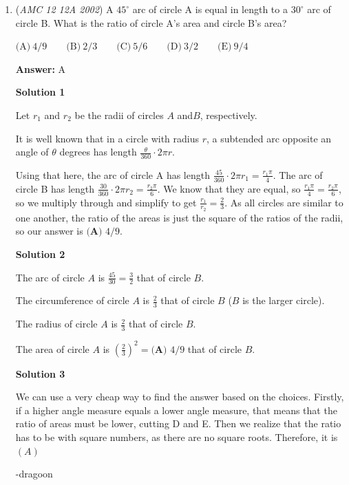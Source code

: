 \begin{enumerate}
 


	\item (\textit{AMC 12 12A 2002}) A $45^\circ$ arc of circle A is equal in length to a $30^\circ$ arc of circle B. What is the ratio of circle A's area and circle B's area?


 $\text{(A)}\ 4/9 \qquad \text{(B)}\ 2/3 \qquad \text{(C)}\ 5/6 \qquad \text{(D)}\ 3/2 \qquad \text{(E)}\ 9/4$

 \textbf{Answer: }A



\textbf{Solution 1}

Let $r_1$ and $r_2$ be the radii of circles $A$ and$B$, respectively. 

 It is well known that in a circle with radius $r$, a subtended arc opposite an angle of $\theta$ degrees has length $\frac{\theta}{360} \cdot 2\pi r$. 

 Using that here, the arc of circle A has length $\frac{45}{360}\cdot2\pi{r_1}=\frac{r_1\pi}{4}$. The arc of circle B has length $\frac{30}{360} \cdot 2\pi{r_2}=\frac{r_2\pi}{6}$. We know that they are equal, so $\frac{r_1\pi}{4}=\frac{r_2\pi}{6}$, so we multiply through and simplify to get $\frac{r_1}{r_2}=\frac{2}{3}$. As all circles are similar to one another, the ratio of the areas is just the square of the ratios of the radii, so our answer is $\boxed{\textbf{(A) } 4/9}$.

 



\textbf{Solution 2}

The arc of circle $A$ is $\frac{45}{30}=\frac{3}{2}$ that of circle $B$.

 The circumference of circle $A$ is $\frac{2}{3}$ that of circle $B$ ($B$ is the larger circle).

 The radius of circle $A$ is $\frac{2}{3}$ that of circle $B$.

 The area of circle $A$ is ${\left(\frac{2}{3}\right)}^2=\boxed{\textbf{(A) } 4/9}$ that of circle $B$.

 



\textbf{Solution 3}

We can use a very cheap way to find the answer based on the choices. Firstly, if a higher angle measure equals a lower angle measure, that means that the ratio of areas must be lower, cutting D and E. Then we realize that the ratio has to be with square numbers, as there are no square roots. Therefore, it is $(A)$

 -dragoon


\end{enumerate}
